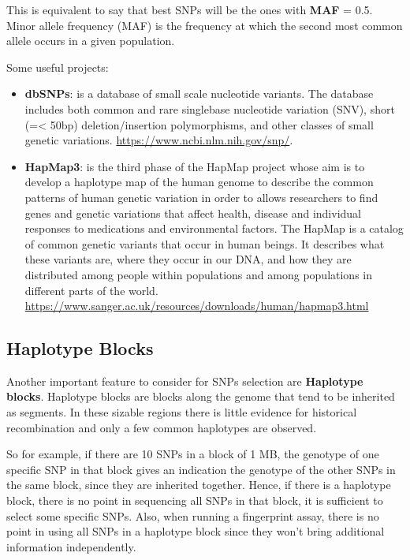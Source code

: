 This is equivalent to say that best SNPs will be the ones with \textbf{MAF} =
0.5. Minor allele frequency (MAF) is the frequency at which the second most
common allele occurs in a given population.


\bigskip
Some useful projects:
\begin{itemize}
	\item \textbf{dbSNPs}: is a database of small scale nucleotide variants. The
	database includes both common and rare singlebase nucleotide variation
	(SNV), short (=< 50bp) deletion/insertion polymorphisms, and other classes
	of small genetic variations. \url{https://www.ncbi.nlm.nih.gov/snp/}.
	
	\item \textbf{HapMap3}: is the third phase of the HapMap project whose aim
	is to develop a haplotype map of the human genome to describe the common
	patterns of human genetic variation in order to allows researchers to find
	genes and genetic variations that affect health, disease and individual
	responses to medications and environmental factors. The HapMap is a catalog
	of common genetic variants that occur in human beings. It describes what
	these variants are, where they occur in our DNA, and how they are
	distributed among people within populations and among populations in
	different parts of the world.
	\url{https://www.sanger.ac.uk/resources/downloads/human/hapmap3.html}
\end{itemize}

\subsection{Haplotype Blocks}

Another important feature to consider for SNPs selection are \textbf{Haplotype
blocks}. Haplotype blocks are blocks along the genome that tend to be inherited
as segments. In these sizable regions there is little evidence for historical
recombination and only a few common haplotypes are observed. 

So for example, if there are 10 SNPs in a block of 1 MB, the genotype of one
specific SNP in that block gives an indication the genotype of the other SNPs in
the same block, since they are inherited together. Hence, if there is a
haplotype block, there is no point in sequencing all SNPs in that block, it is
sufficient to select some specific SNPs. Also, when running a fingerprint assay,
there is no point in using all SNPs in a haplotype block since they won't bring
additional information independently.

